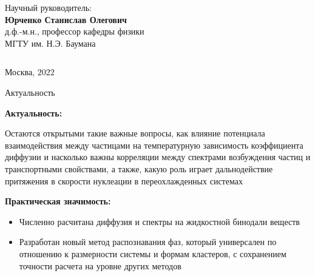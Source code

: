 \documentclass{beamer}
\begin{document}
\begin{frame}
\begin{columns}
\begin{column}{0.50\textwidth}
\begin{center}
\tiny Научный руководитель:\\
\vspace{0.1cm}
\tiny \textbf{Юрченко Станислав Олегович} \\
\tiny д.ф.-м.н., профессор кафедры физики\\
\tiny МГТУ им. Н.Э. Баумана \\
\end{center}


\end{column}
\end{columns}


\vspace{0.5cm}
\begin{center}
\tiny Москва, $2022$
\end{center}
\end{frame}






\begin{frame}{Актуальность}
\footnotesize{

\textbf{Актуальность:}

Остаются открытыми такие важные вопросы, как влияние потенциала взаимодействия между частицами на температурную зависимость коэффициента диффузии и насколько важны корреляции между спектрами возбуждения частиц и транспортными свойствами, а также, какую роль играет дальнодействие притяжения в скорости нуклеации в переохлажденных системах

\vspace{1cm}

\textbf{Практическая значимость:}

\begin{itemize}
 \item Численно расчитана диффузия и спектры на жидкостной бинодали веществ
 \item Разработан новый метод распознавания фаз, который универсален по отношению к размерности системы и формам кластеров, с сохранением точности расчета на уровне других методов
\end{itemize}


}
\end{frame}
\end{document}
